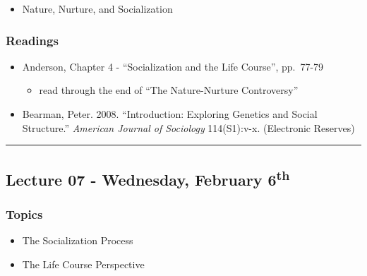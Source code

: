 \documentclass[]{book}
\providecommand{\tightlist}{%
  \setlength{\itemsep}{0pt}\setlength{\parskip}{0pt}}
\begin{document}
\begin{itemize}
\tightlist
\item
  Nature, Nurture, and Socialization
\end{itemize}

\hypertarget{readings-6}{%
\subsubsection*{Readings}\label{readings-6}}

\begin{itemize}
\tightlist
\item
  Anderson, Chapter 4 - ``Socialization and the Life Course'', pp.~77-79

  \begin{itemize}
  \tightlist
  \item
    read through the end of ``The Nature-Nurture Controversy''
  \end{itemize}
\item
  Bearman, Peter. 2008. ``Introduction: Exploring Genetics and Social Structure.'' \emph{American Journal of Sociology} 114(S1):v-x. (Electronic Reserves)
\end{itemize}

\begin{center}\rule{0.5\linewidth}{\linethickness}\end{center}

\hypertarget{lecture-07---wednesday-february-6th}{%
\subsection*{\texorpdfstring{Lecture 07 - Wednesday, February 6\textsuperscript{th}}{Lecture 07 - Wednesday, February 6th}}\label{lecture-07---wednesday-february-6th}}

\hypertarget{topics-7}{%
\subsubsection*{Topics}\label{topics-7}}

\begin{itemize}
\tightlist
\item
  The Socialization Process
\item
  The Life Course Perspective
\end{itemize}
\end{document}
